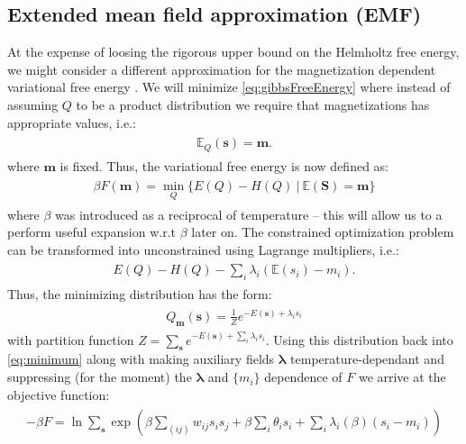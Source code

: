 \subsection{Extended mean field approximation (EMF)}
At the expense of loosing the rigorous upper bound on the Helmholtz free energy, we might consider a different approximation for the magnetization dependent variational free energy \cite{georges1991expand}. We will minimize \ref{eq:gibbsFreeEnergy} where instead of assuming $Q$ to be a product distribution we require that magnetizations has appropriate values, i.e.:
\begin{align}
\begin{split}
\mathbb{E}_Q (\mathbf{s}) = \mathbf{m} .
\label{eq:constraint}
\end{split}
\end{align}
 where $\mathbf{m}$ is fixed. Thus, the variational free energy is now defined as: 
 \begin{align}
\begin{split}
\beta F(\mathbf{m}) = \min_{Q} \{E(Q) - H(Q) ~|~\mathbb{E}(\mathbf{S}) = \mathbf{m} \}
\label{eq:minimum}
\end{split}
\end{align}
	where $\beta$ was introduced as a reciprocal of temperature -- this will allow us to a perform useful expansion w.r.t $\beta$ later on. The constrained optimization problem can be transformed into unconstrained using Lagrange multipliers, i.e.:
 \begin{align}
\begin{split}
E(Q) - H(Q) -  \sum_i \lambda_i(\mathbb{E}(s_i) - m_i). 
\end{split}
\end{align}
Thus, the minimizing distribution has the form:
 \begin{align}
\begin{split}
Q_{\mathbf{m}}(\mathbf{s}) = \frac{1}{Z} e^{-E(\mathbf{s}) + \lambda_i s_i}
\end{split}
\end{align}
with partition function $Z = \sum_{\mathbf{s}} e^{-E(\mathbf{s}) + \sum_i \lambda_i s_i}$. Using this distribution back into \ref{eq:minimum} along with making auxiliary fields $\mathbf{\lambda}$ temperature-dependant and suppressing (for the moment) the $\mathbf{\lambda}$ and $\{m_i \}$ dependence of $F$ we arrive at the objective function:
 \begin{align}
\begin{split} - \beta F = \ln \sum_{\mathbf{s}} \exp \left( \beta \sum_{(ij)} w_{ij} s_i s_j +\beta \sum_i  \theta_i s_i  + \sum_i \lambda_i (\beta) (s_i - m_i) \right)
\end{split}
\end{align}

